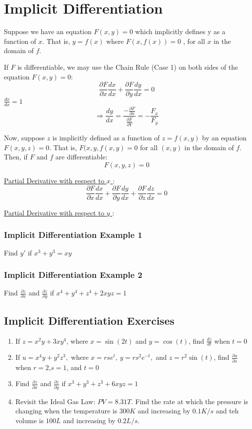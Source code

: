\documentclass[12pt]{article}
\begin{document}
\section{Implicit Differentiation}

Suppose we have an equation \(F(x,y) = 0\) which implicitly defines y as a function of \(x\). That is, \(y=f(x)\) where \(F(x,f(x)) = 0\) , for all \(x\)  in the domain of \(f\).  

If \(F\) is differentiable, we may use the Chain Rule (Case 1) on both sides of the equation \(F(x,y) = 0\):
\[
	\frac{\partial F}{\partial x} \frac{dx}{dx} + \frac{\partial F}{\partial y} \frac{dy}{dx} =0
\]
\(\frac{dx}{dx} = 1\) 
\[
	\Rightarrow \frac{dy}{dx}= \frac{-\frac{\partial F}{\partial x} }{\frac{\partial F}{\partial Y} } = -\frac{F_x}{F_y}	
\]

Now, suppose \(z\) is implicitly defined as a function of \(z=f(x,y)\) by an equation \(F(x,y,z) = 0\). That is, \(F(x,y,f(x,y) = 0\) for all \((x,y)\) in the domain of \(f\). Then, if \(F\) and \(f\) are differentiable:
\[
	F(x,y,z) = 0
\]

\underline{Partial Derivative with respect to \(x\) }:
\[
	\frac{\partial F}{\partial x} \frac{dx}{dx} + \frac{\partial F}{\partial y} \frac{dy}{dx} + \frac{\partial F}{\partial z} \frac{dz}{dx} = 0
\]

\underline{Partial Derivative with respect to \(y\) }:
\[
\]
\subsubsection{Implicit Differentiation Example 1}
Find \(y'\) if \(x^3+y^3=xy\) 

\subsubsection{Implicit Differentiation Example 2}
Find \(\frac{\partial z}{\partial x} \) and \(\frac{\partial z}{\partial y} \) if \(x^4+y^4+z^4+2xyz = 1\) 

\subsection{Implicit Differentiation Exercises}
\begin{enumerate}
	\item If \(z=x^2y+3xy^4\), where \(x=\sin(2t)\) and \(y=\cos(t)\), find \(\frac{dz}{dt}\) when \(t=0\)   
	\item If \(u=x^4y+y^2z^3, \) where \(x=rse^t,\ y=rs^2e^{-t},\) and \(z=r^2\sin(t)\), find \(\frac{\partial u}{\partial s}\) when \(r=2\),\(s=1\), and \(t=0\)   
	\item Find \(\frac{\partial z}{\partial x} \) and \(\frac{\partial z}{\partial y} \) if \(x^3+y^3+z^3+6xyz = 1\) 
	\item Revisit the Ideal Gas Law: \(PV = 8.31T\). Find the rate at which the pressure is changing when the temperature is \(300K\) and increasing by \(0.1K/s\) and teh volume is \(100L\) and increasing by \(0.2L/s\).  
\end{enumerate}
\end{document}
